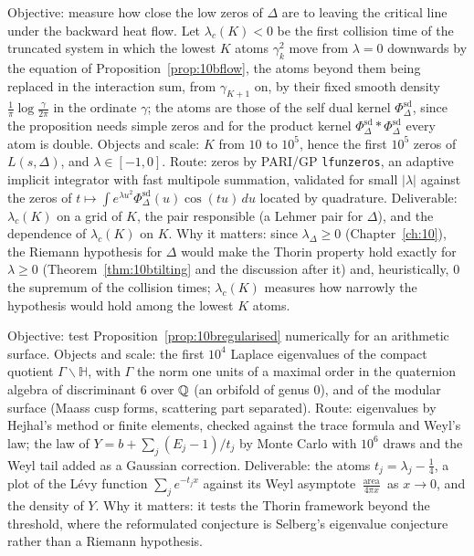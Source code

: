 \begin{compproblem}
Objective: measure how close the low zeros of $\Delta$ are to leaving the critical line under the backward heat flow. Let $\lambda_c(K)<0$ be the first collision time of the truncated system in which the lowest $K$ atoms $\gamma_k^2$ move from $\lambda = 0$ downwards by the equation of Proposition~\ref{prop:10bflow}, the atoms beyond them being replaced in the interaction sum, from $\gamma_{K+1}$ on, by their fixed smooth density $\frac1\pi\log\frac{\gamma}{2\pi}$ in the ordinate $\gamma$; the atoms are those of the self dual kernel $\Phi^{\mathrm{sd}}_\Delta$, since the proposition needs simple zeros and for the product kernel $\Phi^{\mathrm{sd}}_\Delta*\Phi^{\mathrm{sd}}_\Delta$ every atom is double. Objects and scale: $K$ from $10$ to $10^5$, hence the first $10^5$ zeros of $L(s,\Delta)$, and $\lambda\in[-1,0]$. Route: zeros by PARI/GP \texttt{lfunzeros}, an adaptive implicit integrator with fast multipole summation, validated for small $|\lambda|$ against the zeros of $t\mapsto\int e^{\lambda u^2}\Phi^{\mathrm{sd}}_\Delta(u)\cos(tu)\,du$ located by quadrature. Deliverable: $\lambda_c(K)$ on a grid of $K$, the pair responsible (a Lehmer pair for $\Delta$), and the dependence of $\lambda_c(K)$ on $K$. Why it matters: since $\lambda_\Delta\ge0$ (Chapter~\ref{ch:10}), the Riemann hypothesis for $\Delta$ would make the Thorin property hold exactly for $\lambda\ge0$ (Theorem~\ref{thm:10btilting} and the discussion after it) and, heuristically, $0$ the supremum of the collision times; $\lambda_c(K)$ measures how narrowly the hypothesis would hold among the lowest $K$ atoms.
\end{compproblem}

\begin{compproblem}
Objective: test Proposition~\ref{prop:10bregularised} numerically for an arithmetic surface. Objects and scale: the first $10^4$ Laplace eigenvalues of the compact quotient $\Gamma\backslash\mathbb H$, with $\Gamma$ the norm one units of a maximal order in the quaternion algebra of discriminant $6$ over $\mathbb{Q}$ (an orbifold of genus $0$), and of the modular surface (Maass cusp forms, scattering part separated). Route: eigenvalues by Hejhal's method or finite elements, checked against the trace formula and Weyl's law; the law of $Y = b+\sum_j(E_j-1)/t_j$ by Monte Carlo with $10^6$ draws and the Weyl tail added as a Gaussian correction. Deliverable: the atoms $t_j = \lambda_j-\frac14$, a plot of the L\'evy function $\sum_je^{-t_jx}$ against its Weyl asymptote $\frac{\operatorname{area}}{4\pi x}$ as $x\to0$, and the density of $Y$. Why it matters: it tests the Thorin framework beyond the threshold, where the reformulated conjecture is Selberg's eigenvalue conjecture rather than a Riemann hypothesis.
\end{compproblem}
